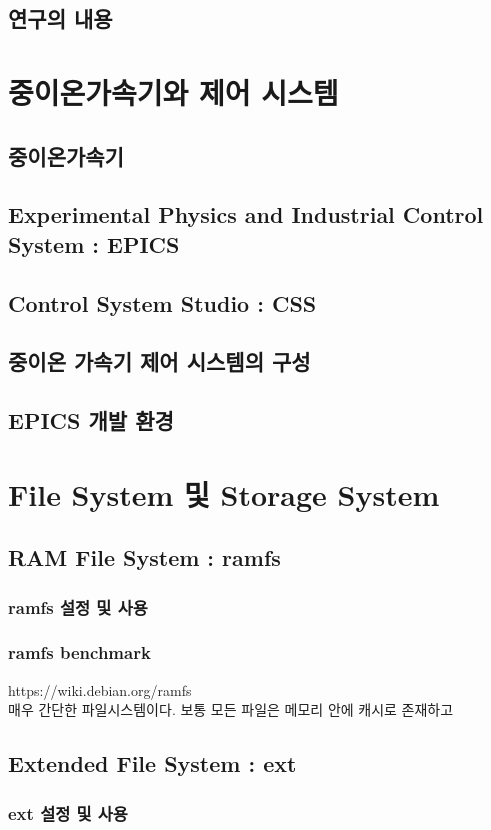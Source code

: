\documentclass[11pt
  , a4paper
  , article
  , oneside
]{memoir}
\begin{document}
\section{연구의 내용}

\chapter{중이온가속기와 제어 시스템}
\section{중이온가속기}
\section{Experimental Physics and Industrial Control System : EPICS}
\section{Control System Studio : CSS}
\section{중이온 가속기 제어 시스템의 구성}
\section{EPICS 개발 환경}

\chapter{File System 및 Storage System }
\section{RAM File System : ramfs}
\subsection{ramfs 설정 및 사용}
\subsection{ramfs benchmark}
https://wiki.debian.org/ramfs\\
매우 간단한 파일시스템이다. 보통 모든 파일은 메모리 안에 캐시로 존재하고
\section{Extended File System : ext}
\subsection{ext 설정 및 사용}
\end{document}
